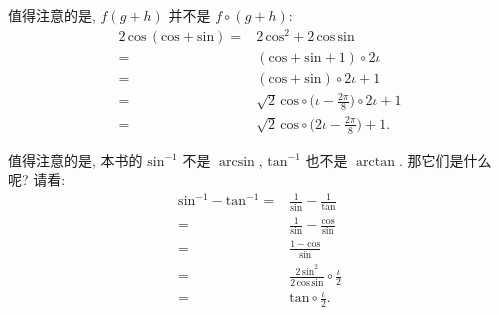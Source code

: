 \begin{example}
    值得注意的是, $f(g + h)$ 并不是 $f \circ (g + h)$:
    \begin{align*}
        2\,\mathrm{cos} \,(\mathrm{cos} + \mathrm{sin})
        = {} & 2\,\mathrm{cos}^2 + 2 \,\mathrm{cos} \,\mathrm{sin}                                \\
        = {} & (\mathrm{cos} + \mathrm{sin} + 1) \circ {2\iota}                                   \\
        = {} & (\mathrm{cos} + \mathrm{sin}) \circ {2\iota} + 1                                   \\
        = {} & \sqrt{2}\,\mathrm{cos} \circ \bigg( \iota - \frac{2\pi}{8} \bigg) \circ 2\iota + 1 \\
        = {} & \sqrt{2}\,\mathrm{cos} \circ \bigg( 2\iota - \frac{2\pi}{8} \bigg) + 1.
    \end{align*}
\end{example}

\begin{example}
    值得注意的是,
    本书的 $\mathrm{sin}^{-1}$ 不是 $\arcsin$,
    $\mathrm{tan}^{-1}$ 也不是 $\arctan$.
    那它们是什么呢?
    请看:
    \begin{align*}
        \mathrm{sin}^{-1} - \mathrm{tan}^{-1}
        = {} & \frac{1}{\mathrm{sin}} - \frac{1}{\mathrm{tan}}                                   \\
        = {} & \frac{1}{\mathrm{sin}} - \frac{\mathrm{cos}}{\mathrm{sin}}                        \\
        = {} & \frac{1 - \mathrm{cos}} {\mathrm{sin}}                                            \\
        = {} & \frac{2\, \mathrm{sin}^2} {2\, \mathrm{cos}\, \mathrm{sin}} \circ \frac{\iota}{2} \\
        = {} & \mathrm{tan} \circ \frac{\iota}{2}.
    \end{align*}
\end{example}

